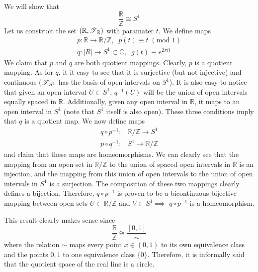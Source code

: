     \begin{example}
      We will show that
      \begin{equation}
        \frac{\mathbb{R}}{\mathbb{Z}} \cong S^1
      \end{equation}
      Let us construct the set $(\mathbb{R}, \T_{\mathbb{R}})$ with paramater $t$. We define maps
      \begin{align*}
        p: \mathbb{R} \rightarrow \mathbb{R} / \mathbb{Z}, \;\; p(t) \equiv t \; (\text{mod } 1) \\
        q: \mathbb[R] \rightarrow S^1 \subset \mathbb{C}, \;\; g(t) \equiv e^{2 \pi i t} 
      \end{align*}
      We claim that $p$ and $q$ are both quotient mappings. Clearly, $p$ is a quotient mapping. As for $q$, it it easy to see that it is surjective (but not injective) and continuous ($\T_{S^1}$ has the basis of open intervals on $S^1$). It is also easy to notice that given an open interval $U \subset S^1$, $q^{-1}(U)$ will be the union of open intervals equally spaced in $\mathbb{R}$. Additionally, given any open interval in $\mathbb{R}$, it maps to an open interval in $S^1$ (note that $S^1$ itself is also open). These three conditions imply that $q$ is a quotient map. We now define maps 
      \begin{align}
        q \circ p^{-1}: & \mathbb{R} / \mathbb{Z} \rightarrow S^1 \\
        p \circ q^{-1}: & S^1 \rightarrow \mathbb{R} / \mathbb{Z}
      \end{align}
      and claim that these maps are homeomorphisms. We can clearly see that the mapping from an open set in $\mathbb{R} / \mathbb{Z}$ to the union of spaced open intervals in $\mathbb{R}$ is an injection, and the mapping from this union of open intervals to the union of open intervals in $S^1$ is a surjection. The composition of these two mappings clearly defines a bijection. Therefore, $q \circ p^{-1}$ is proven to be a bicontinuous bijective mapping between open sets $U \subset \mathbb{R} / \mathbb{Z}$ and $V \subset S^1 \implies$ $q \circ p^{-1}$ is a homeomorphism. 

      This result clearly makes sense since 
      \begin{equation}
        \frac{\mathbb{R}}{\mathbb{Z}} \cong \frac{[0,1]}{\sim}
      \end{equation}
      where the relation $\sim$ maps every point $x \in (0,1)$ to its own equivalence class and the points $0, 1$ to one equivalence class $\{0\}$. Therefore, it is informally said that the quotient space of the real line is a circle. 


\end{example}

